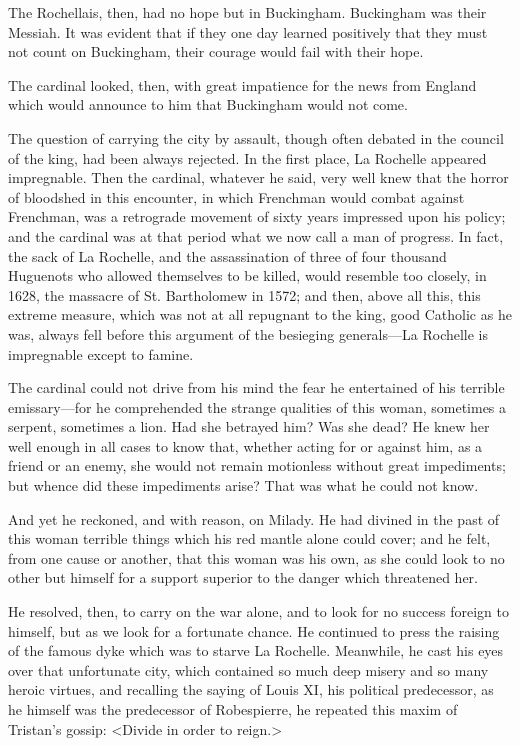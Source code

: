 The Rochellais, then, had no hope but in Buckingham. Buckingham was their Messiah. It was evident that if they one day learned positively that they must not count on Buckingham, their courage would fail with their hope. 

The cardinal looked, then, with great impatience for the news from England which would announce to him that Buckingham would not come. 

The question of carrying the city by assault, though often debated in the council of the king, had been always rejected. In the first place, La Rochelle appeared impregnable. Then the cardinal, whatever he said, very well knew that the horror of bloodshed in this encounter, in which Frenchman would combat against Frenchman, was a retrograde movement of sixty years impressed upon his policy; and the cardinal was at that period what we now call a man of progress. In fact, the sack of La Rochelle, and the assassination of three of four thousand Huguenots who allowed themselves to be killed, would resemble too closely, in 1628, the massacre of St. Bartholomew in 1572; and then, above all this, this extreme measure, which was not at all repugnant to the king, good Catholic as he was, always fell before this argument of the besieging generals---La Rochelle is impregnable except to famine. 

The cardinal could not drive from his mind the fear he entertained of his terrible emissary---for he comprehended the strange qualities of this woman, sometimes a serpent, sometimes a lion. Had she betrayed him? Was she dead? He knew her well enough in all cases to know that, whether acting for or against him, as a friend or an enemy, she would not remain motionless without great impediments; but whence did these impediments arise? That was what he could not know. 

And yet he reckoned, and with reason, on Milady. He had divined in the past of this woman terrible things which his red mantle alone could cover; and he felt, from one cause or another, that this woman was his own, as she could look to no other but himself for a support superior to the danger which threatened her. 

He resolved, then, to carry on the war alone, and to look for no success foreign to himself, but as we look for a fortunate chance. He continued to press the raising of the famous dyke which was to starve La Rochelle. Meanwhile, he cast his eyes over that unfortunate city, which contained so much deep misery and so many heroic virtues, and recalling the saying of Louis XI, his political predecessor, as he himself was the predecessor of Robespierre, he repeated this maxim of Tristan's gossip: <Divide in order to reign.> 

